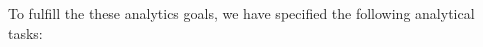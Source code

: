 

\label{section:design_tasks}
To fulfill the these analytics goals, we have specified the following analytical tasks:

